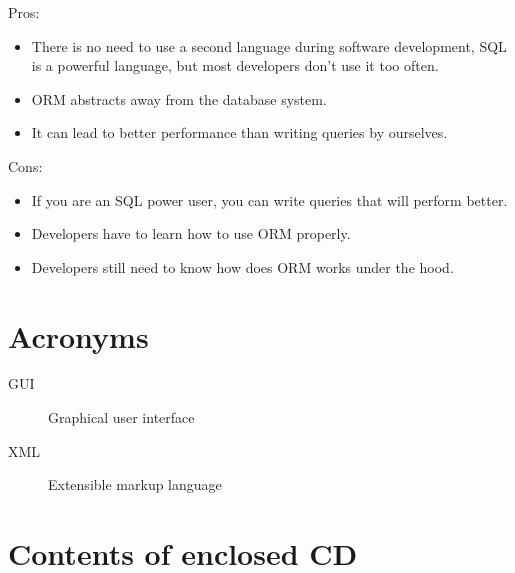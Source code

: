 \documentclass[thesis=M,english]{FITthesis}[2019/12/23]
\begin{document}
\noindent Pros:
\begin{itemize}
    \item There is no need to use a second language during software development, SQL is a powerful language, but most developers don't use it too often.
    \item ORM abstracts away from the database system.
    \item It can lead to better performance than writing queries by ourselves.
\end{itemize}
Cons:
\begin{itemize}
    \item If you are an SQL power user, you can write queries that will perform better.
    \item Developers have to learn how to use ORM properly.
    \item Developers still need to know how does ORM works under the hood.
\end{itemize}





\appendix

\chapter{Acronyms}
\begin{description}
	\item[GUI] Graphical user interface
	\item[XML] Extensible markup language
\end{description}


\chapter{Contents of enclosed CD}


\begin{figure}
\end{figure}
\end{document}
